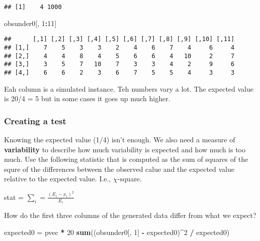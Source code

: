 \documentclass[]{article}
\newenvironment{Shaded}{\begin{snugshade}}{\end{snugshade}}
\newcommand{\KeywordTok}[1]{\textcolor[rgb]{0.13,0.29,0.53}{\textbf{#1}}}
\newcommand{\DecValTok}[1]{\textcolor[rgb]{0.00,0.00,0.81}{#1}}
\newcommand{\StringTok}[1]{\textcolor[rgb]{0.31,0.60,0.02}{#1}}
\newcommand{\OperatorTok}[1]{\textcolor[rgb]{0.81,0.36,0.00}{\textbf{#1}}}
\newcommand{\NormalTok}[1]{#1}
\begin{document}
\begin{verbatim}
## [1]    4 1000
\end{verbatim}

\begin{Shaded}
\begin{Highlighting}[]
\NormalTok{obsunder0[, }\DecValTok{1}\OperatorTok{:}\DecValTok{11}\NormalTok{]}
\end{Highlighting}
\end{Shaded}

\begin{verbatim}
##      [,1] [,2] [,3] [,4] [,5] [,6] [,7] [,8] [,9] [,10] [,11]
## [1,]    7    5    3    3    2    4    6    7    4     6     4
## [2,]    4    4    8    4    5    6    6    4   10     2     7
## [3,]    3    5    7   10    7    3    3    4    2     9     6
## [4,]    6    6    2    3    6    7    5    5    4     3     3
\end{verbatim}

Eah column is a simulated instance. Teh numbers vary a lot. The expected
value is 20/4 = 5 but in some cases it goes up much higher.

\subsubsection{Creating a test}\label{creating-a-test}

Knowing the expected value (1/4) isn't enough. We also need a measure of
\textbf{variability} to describe how much variability is expected and
how much is too much. Use the following statistic that is computed as
the sum of squares of the squre of the differences between the observed
calue and the expected value relative to the expected value. I.e.,
\(\chi\)-square.

stat = \(\sum_i = \frac{(E_i - x_i)^2}{E_i}\)

How do the first three columns of the generated data differ from what we
expect?

\begin{Shaded}
\begin{Highlighting}[]
\NormalTok{expected0 =}\StringTok{ }\NormalTok{pvec }\OperatorTok{*}\StringTok{ }\DecValTok{20}
\KeywordTok{sum}\NormalTok{((obsunder0[, }\DecValTok{1}\NormalTok{] }\OperatorTok{-}\StringTok{ }\NormalTok{expected0)}\OperatorTok{^}\DecValTok{2} \OperatorTok{/}\StringTok{ }\NormalTok{expected0)}
\end{Highlighting}
\end{Shaded}
\end{document}
